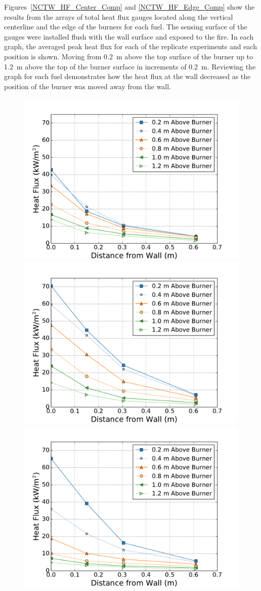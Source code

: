 \documentclass[twoside]{uocthesis}
\begin{document}
{Figures~\ref{NCTW_HF_Center_Comp} and \ref{NCTW_HF_Edge_Comp} show the results from the arrays of total heat flux gauges located along the vertical centerline and the edge of the burners for each fuel.  The sensing surface of the gauges were installed flush with the wall surface and exposed to the fire. In each graph, the averaged peak heat flux for each of the replicate experiments and each position is shown.  Moving from 0.2~m above the top surface of the burner up to 1.2~m above the top of the burner surface in increments of 0.2~m.  Reviewing the graph for each fuel demonstrates how the heat flux at the wall decreased as the position of the burner was moved away from the wall.  

\begin{figure}[p]
	\centering
	\includegraphics[width=.6\columnwidth]{../Figures/NCTW_NG_HF_Center_Avg} \\
	\includegraphics[width=.6\columnwidth]{../Figures/NCTW_GAS_HF_Center_Avg}\\
	\includegraphics[width=.6\columnwidth]{../Figures/NCTW_PUF_HF_Center_Avg} \\

\end{figure}}
\end{document}
